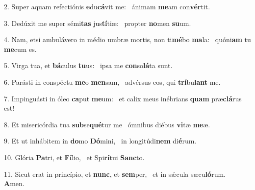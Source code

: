 2. Super aquam refectiónis \textbf{e}du\textbf{cá}vit me: \ast\  ánimam \textbf{me}am con\textbf{vér}tit.\

3. Dedúxit me super sémi\textbf{tas} jus\textbf{tí}tiæ: \ast\  propter \textbf{no}men \textbf{su}um.\

4. Nam, etsi ambulávero in médio umbræ mortis, non ti\textbf{mé}bo \textbf{ma}la: \ast\  quóni\textbf{am} tu \textbf{me}cum es.\

5. Virga tua, et \textbf{bá}culus \textbf{tu}us: \ast\  ipsa me \textbf{con}so\textbf{lá}ta sunt.\

6. Parásti in conspéctu \textbf{me}o \textbf{men}sam, \ast\  advérsus eos, qui \textbf{trí}bu\textbf{lant} me.\

7. Impinguásti in óleo \textbf{ca}put \textbf{me}um: \ast\  et calix meus inébrians \textbf{quam} præ\textbf{clá}rus est!\

8. Et misericórdia tua \textbf{sub}se\textbf{qué}tur me \ast\  ómnibus diébus \textbf{vi}tæ \textbf{me}æ.\

9. Et ut inhábitem in \textbf{do}mo \textbf{Dó}mini, \ast\  in longitúdi\textbf{nem} di\textbf{é}rum.\

10. Glória \textbf{Pa}tri, et \textbf{Fí}lio, \ast\  et Spi\textbf{rí}tui \textbf{Sanc}to.\

11. Sicut erat in princípio, et \textbf{nunc}, et \textbf{sem}per, \ast\  et in sǽcula sæcu\textbf{ló}rum. \textbf{A}men.\

